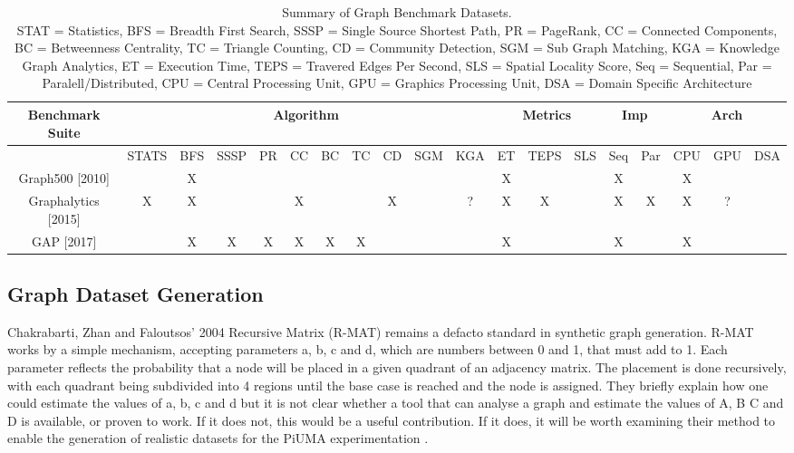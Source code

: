 \documentclass[sigconf,anonymous, authordraft]{acmart}
\begin{document}
\begin{table*}[t]
  \begin{tabular}{ |c|c|c|c|c|c|c|c|c|c|c|c|c|c|c|c|c|c|c|}
    \hline
    {Benchmark Suite} & \multicolumn{10}{|c|}{Algorithm} & \multicolumn{3}{|c|}{Metrics} & \multicolumn{2}{|c|}{Imp} & \multicolumn{3}{|c|}{Arch}\\
    \hline
                                          & STATS & BFS & SSSP & PR & CC & BC & TC & CD & SGM & KGA & ET & TEPS & SLS & Seq & Par & CPU & GPU & DSA \\
    \hline
     Graph500 [2010]\cite{Murphy2010}     &       & X   &      &    &    &    &    &    &     &     &  X &      &     & X   &     & X   &     &     \\
     Graphalytics [2015]\cite{Capota2015} &   X   & X   &      &    & X  &    &    &  X &     & ?   &  X &   X  &     & X   &  X  & X   &  ?  &     \\
     GAP [2017]\cite{Beamer2017}          &       & X   & X    & X  & X  & X  & X  &    &     &     &  X &      &     & X   &     & X   &     &     \\
    \hline
  \end{tabular}
  \caption{Summary of Graph Benchmark Datasets.\\ STAT = Statistics, BFS = Breadth First Search, SSSP = Single Source Shortest Path, PR = PageRank, CC = Connected Components, BC = Betweenness Centrality, TC = Triangle Counting, CD = Community Detection, SGM = Sub Graph Matching, KGA = Knowledge Graph Analytics, ET = Execution Time, TEPS = Travered Edges Per Second, SLS = Spatial Locality Score, Seq = Sequential, Par = Paralell/Distributed, CPU = Central Processing Unit, GPU = Graphics Processing Unit, DSA = Domain Specific Architecture}
  \label{table:graphBenchmarks}
\end{table*}
\normalfont

\subsection{Graph Dataset Generation}

\par{Chakrabarti, Zhan and Faloutsos' 2004 Recursive Matrix (R-MAT) remains a defacto standard in synthetic graph generation. 
R-MAT works by a simple mechanism, accepting parameters a, b, c and d, which are numbers between 0 and 1, that must add to 1. 
Each parameter reflects the probability that a node will be placed in a given quadrant of an adjacency matrix. 
The placement is done recursively, with each quadrant being subdivided into 4 regions until the base case is reached and the node is assigned. 
They briefly explain how one could estimate the values of a, b, c and d but it is not clear whether a tool that can analyse a graph and estimate the values of A, B C and D is available, or proven to work. 
If it does not, this would be a useful contribution. 
If it does, it will be worth examining their method to enable the generation of realistic datasets for the PiUMA experimentation \cite{Chakrabarti2004}.}
\end{document}
